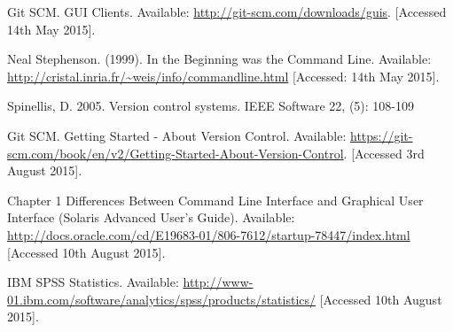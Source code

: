 \documentclass[a4paper,oneside]{bth} %
\begin{document}
\begin{thebibliography}{1}
			Git SCM. GUI Clients. Available: \url{http://git-scm.com/downloads/guis}. [Accessed 14th May 2015].
			
			Neal Stephenson. (1999). In the Beginning was the Command Line. Available: \url{http://cristal.inria.fr/~weis/info/commandline.html}	[Accessed: 14th May 2015].
			
			Spinellis, D. 2005. Version control systems. IEEE Software 22, (5): 108-109	
			
			Git SCM. Getting Started - About Version Control. Available: \url{https://git-scm.com/book/en/v2/Getting-Started-About-Version-Control}. [Accessed 3rd August 2015].
			
			Chapter 1 Differences Between Command Line Interface and Graphical User Interface (Solaris Advanced User's Guide). Available: \url{http://docs.oracle.com/cd/E19683-01/806-7612/startup-78447/index.html} [Accessed 10th August 2015].
			
			IBM SPSS Statistics. Available: \url{http://www-01.ibm.com/software/analytics/spss/products/statistics/} [Accessed 10th August 2015].
			
		\end{thebibliography}
		
		\appendix
\end{document}
